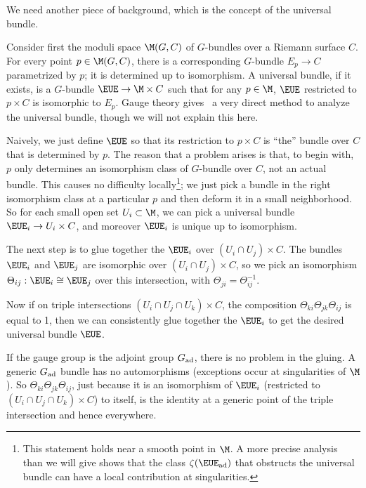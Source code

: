 \par{}

We need another piece of background, which is the concept of the
universal bundle.

Consider first the moduli space $\M(G,C)$ of $G$-bundles over a
Riemann surface $C$.  For every point $p\in \M(G,C)$, there is a
corresponding $G$-bundle $E_p\to C$ parametrized by $p$; it is
determined up to isomorphism.  A universal bundle, if it exists,
is a $G$-bundle ${\EUE} \to \M\times C$ such that for any $p\in
\M$, ${\EUE}$ restricted to $p\times C$ is isomorphic to $E_p$.
Gauge theory gives \cite{ref91}\ a very direct method to analyze the
universal bundle, though we will not explain this here.

Naively, we just define ${\EUE}$ so that its restriction to
$p\times C$ is ``the'' bundle over $C$ that is determined by $p$.
The reason that a problem arises is that, to begin with, $p$ only
determines an isomorphism class of $G$-bundle over $C$, not an
actual bundle. This causes no difficulty locally\footnote{This statement holds
near a smooth point in $\M$.  A more precise
analysis than we will give shows that the class
$\zeta(\EUE_{\rm ad})$ that obstructs the universal bundle can have a local contribution
at singularities.};
we just pick a
bundle in the right isomorphism class at a particular $p$ and then
deform it in a small neighborhood. So for each small open set
$U_i\subset \M$, we can pick a universal bundle ${\EUE}_i\to
U_i\times C$, and moreover ${\EUE}_i$ is unique up to isomorphism.

The next step is to glue together the ${\EUE}_i$ over $ (U_i\cap
U_j)\times C$.  The bundles ${\EUE}_i$ and ${\EUE}_j$ are
isomorphic over $ (U_i\cap U_j)\times C$, so we pick an
isomorphism $\Theta_{ij}:{\EUE}_i\cong {\EUE}_j$ over this
intersection, with $\Theta_{ji}=\Theta_{ij}^{-1}$.

Now if on triple intersections $(U_i\cap U_j\cap U_k)\times C$,
the composition $\Theta_{ki}\Theta_{jk}\Theta_{ij}$ is equal to 1,
then we can consistently glue together the ${\EUE}_i$ to get the
desired universal bundle ${\EUE}$.

If the gauge group is the adjoint group $G_{{\rm ad}}$, there is
no problem in the gluing. A generic $G_{{\rm ad}}$ bundle has no
automorphisms (exceptions occur at singularities of $\M$). So
$\Theta_{ki}\Theta_{jk}\Theta_{ij}$, just because it is an
isomorphism of ${\EUE}_i$ (restricted to $(U_i\cap U_j\cap
U_k)\times C$) to itself, is the identity at a generic point of
the triple intersection and hence everywhere.

